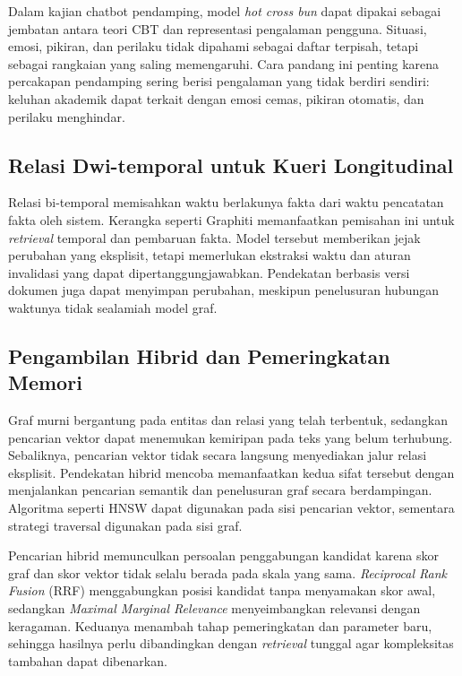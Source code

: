 Dalam kajian chatbot pendamping, model \textit{hot cross bun} dapat dipakai sebagai jembatan antara teori CBT dan representasi pengalaman pengguna. Situasi, emosi, pikiran, dan perilaku tidak dipahami sebagai daftar terpisah, tetapi sebagai rangkaian yang saling memengaruhi. Cara pandang ini penting karena percakapan pendamping sering berisi pengalaman yang tidak berdiri sendiri: keluhan akademik dapat terkait dengan emosi cemas, pikiran otomatis, dan perilaku menghindar.

\subsection{Relasi Dwi-temporal untuk Kueri Longitudinal}
\label{subsec:bi-temporal}

Relasi bi-temporal memisahkan waktu berlakunya fakta dari waktu pencatatan fakta oleh sistem. Kerangka seperti Graphiti \parencite{rasmussen2025zep} memanfaatkan pemisahan ini untuk \textit{retrieval} temporal dan pembaruan fakta. Model tersebut memberikan jejak perubahan yang eksplisit, tetapi memerlukan ekstraksi waktu dan aturan invalidasi yang dapat dipertanggungjawabkan. Pendekatan berbasis versi dokumen juga dapat menyimpan perubahan, meskipun penelusuran hubungan waktunya tidak sealamiah model graf.

\subsection{Pengambilan Hibrid dan Pemeringkatan Memori}
\label{subsec:hybrid-retrieval}

Graf murni bergantung pada entitas dan relasi yang telah terbentuk, sedangkan pencarian vektor dapat menemukan kemiripan pada teks yang belum terhubung. Sebaliknya, pencarian vektor tidak secara langsung menyediakan jalur relasi eksplisit. Pendekatan hibrid mencoba memanfaatkan kedua sifat tersebut dengan menjalankan pencarian semantik dan penelusuran graf secara berdampingan. Algoritma seperti HNSW \parencite{malkovYashunin2018hnsw} dapat digunakan pada sisi pencarian vektor, sementara strategi traversal digunakan pada sisi graf.

Pencarian hibrid memunculkan persoalan penggabungan kandidat karena skor graf dan skor vektor tidak selalu berada pada skala yang sama. \textit{Reciprocal Rank Fusion} (RRF) menggabungkan posisi kandidat tanpa menyamakan skor awal, sedangkan \textit{Maximal Marginal Relevance} menyeimbangkan relevansi dengan keragaman. Keduanya menambah tahap pemeringkatan dan parameter baru, sehingga hasilnya perlu dibandingkan dengan \textit{retrieval} tunggal agar kompleksitas tambahan dapat dibenarkan.

